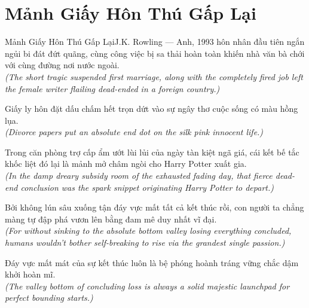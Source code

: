 \section{Mảnh Giấy Hôn Thú Gấp Lại}
\begin{truyen}{Mảnh Giấy Hôn Thú Gấp Lại}{J.K. Rowling --- Anh, 1993}
 hôn nhân đầu tiên ngắn ngủi bi đát đứt quãng, cùng công việc bị sa thải hoàn toàn khiến nhà văn bà chới với cùng đường nơi nước ngoài.\\[4pt]
\textit{(The short tragic suspended first marriage, along with the completely fired job left the female writer flailing dead-ended in a foreign country.)}

Giấy ly hôn đặt dấu chấm hết trọn dứt vào sự ngây thơ cuộc sống có màu hồng lụa.\\[4pt]
\textit{(Divorce papers put an absolute end dot on the silk pink innocent life.)}

Trong căn phòng trợ cấp ẩm ướt lùi lủi của ngày tàn kiệt ngã giá, cái kết bế tắc khốc liệt đó lại là mảnh mở châm ngòi cho Harry Potter xuất gia.\\[4pt]
\textit{(In the damp dreary subsidy room of the exhausted fading day, that fierce dead-end conclusion was the spark snippet originating Harry Potter to depart.)}

Bởi không lún sâu xuống tận đáy vực mất tất cả kết thúc rồi, con người ta chẳng màng tự đập phá vươn lên bằng đam mê duy nhất vĩ đại.\\[4pt]
\textit{(For without sinking to the absolute bottom valley losing everything concluded, humans wouldn't bother self-breaking to rise via the grandest single passion.)}

\end{truyen}
\begin{baihoc}
  Đáy vực mất mát của sự kết thúc luôn là bệ phóng hoành tráng vững chắc dậm khởi hoàn mĩ.\\[4pt]
  \textit{(The valley bottom of concluding loss is always a solid majestic launchpad for perfect bounding starts.)}
\end{baihoc}


